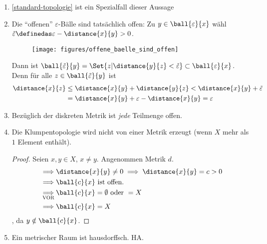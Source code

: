\begin{bemerkungen}
    \begin{enumerate}
        \item \ref{standard-topologie} ist ein Spezialfall dieser Aussage
        \item Die \enquote{offenen} \( \varepsilon \)-Bälle sind tatsächlich offen: Zu \( y\in \ball{\varepsilon}{x} \) wähl \( \tilde{\varepsilon}\definedas \varepsilon-\distance{x}{y}>0 \).
        \begin{figure}[H]
            \centering
            \texttt{[image: figures/offene\_baelle\_sind\_offen]}
            \label{fig:offene_baelle_sind_offen}
        \end{figure}
        Dann ist \( \ball{\tilde{\varepsilon}}{y}=\Set{z|\distance{y}{z}<\tilde{\varepsilon}} \subset \ball{\varepsilon}{x}\). Denn für alle \( z\in \ball{\tilde{\varepsilon}}{y} \) ist
        \begin{align*}
            \distance{x}{z}\begin{aligned}[t] 
                &\leq \distance{x}{y}+\distance{y}{z}<\distance{x}{y}+\tilde{\varepsilon}\\
                &=\distance{x}{y}+\varepsilon-\distance{x}{y}=\varepsilon
            \end{aligned}
        \end{align*}
        
        \item Bezüglich der diskreten Metrik ist \emph{jede} Teilmenge offen.
        \item Die Klumpentopologie wird nicht von einer Metrik erzeugt (wenn \( X \) mehr als \( 1 \) Element enthält).
        \begin{proof}
            Seien \( x,y\in X \), \( x\neq y \). Angenommen \texists Metrik \( d \).
            \begin{align*}
                \implies &\distance{x}{y}\neq 0\implies \distance{x}{y}=c>0\\
                \implies &\ball{c}{x}\text{ ist offen.}\\
                \underset{\text{\scshape{VOR}}}{\implies} &\ball{c}{x}=\emptyset \text{ oder } =X\\
                \implies &\ball{c}{x}=X
            \end{align*}
            \contra, da \( y\notin \ball{c}{x} \).
            
        \end{proof}
        
        \item \label{metrischer_raum_ist_hausdorffsch} Ein metrischer Raum ist hausdorffsch. \tto HA\@.
        
    \end{enumerate}
\end{bemerkungen}
